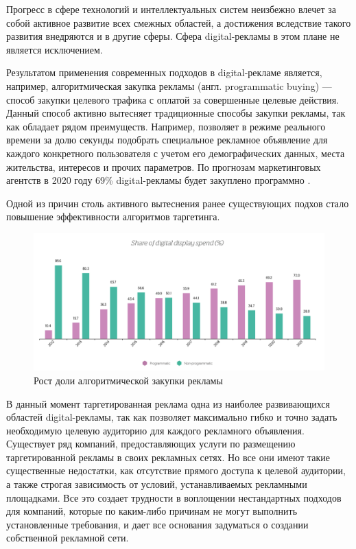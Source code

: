 \documentclass[times]{itmo-student-thesis}
\begin{document}
\tableofcontents






\startprefacepage

Прогресс в сфере технологий и интеллектуальных систем неизбежно влечет за собой активное развитие всех смежных областей, а достижения вследствие такого развития внедряются и в другие сферы. Сфера digital-рекламы в этом плане не является исключением. 

Результатом применения современных подходов в digital-рекламе является, например, алгоритмическая закупка рекламы (англ. programmatic buying) \cite{programmatic-buying} — способ закупки целевого трафика с оплатой за совершенные целевые действия. Данный способ активно вытесняет традиционные способы закупки рекламы, так как обладает рядом преимуществ. Например, позволяет в режиме реального времени за долю секунды подобрать специальное рекламное объявление для каждого конкретного пользователя с учетом его демографических данных, места жительства, интересов и прочих параметров. По прогнозам маркетинговых агентств в 2020 году 69\% digital-рекламы будет закуплено программно \cite{growth-of-programmatic}. 

Одной из причин столь активного вытеснения ранее существующих подхов стало повышение эффективности алгоритмов таргетинга. 

\begin{figure}[!h]
\caption{Рост доли алгоритмической закупки рекламы}\label{fig:share-of-programmatic}
\includegraphics[width=\textwidth]{share-of-programmatic}
\centering
\end{figure}

В данный момент таргетированная реклама одна из наиболее развивающихся областей digital-рекламы, так как позволяет максимально гибко и точно задать необходимую целевую аудиторию для каждого рекламного объявления. Существует ряд компаний, предоставляющих услуги по размещению таргетированной рекламы в своих рекламных сетях. Но все они имеют такие существенные недостатки, как отсутствие прямого доступа к целевой аудитории, а также строгая зависимость от условий, устанавливаемых рекламными площадками. Все это создает трудности в воплощении нестандартных подходов для компаний, которые по каким-либо причинам не могут выполнить установленные требования, и дает все основания задуматься о создании собственной рекламной сети.
\end{document}

